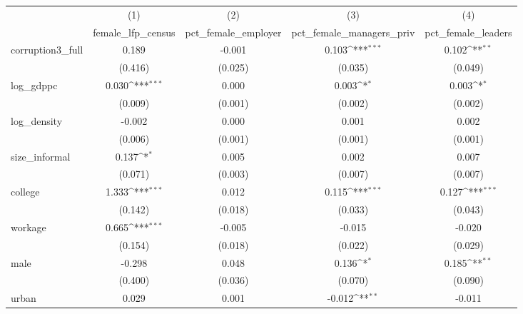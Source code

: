 {
\def\sym#1{\ifmmode^{#1}\else\(^{#1}\)\fi}
\begin{tabular}{l*{4}{c}}
\hline\hline
            &\multicolumn{1}{c}{(1)}&\multicolumn{1}{c}{(2)}&\multicolumn{1}{c}{(3)}&\multicolumn{1}{c}{(4)}\\
            &\multicolumn{1}{c}{female\_lfp\_census}&\multicolumn{1}{c}{pct\_female\_employer}&\multicolumn{1}{c}{pct\_female\_managers\_priv}&\multicolumn{1}{c}{pct\_female\_leaders}\\
\hline
corruption3\_full&       0.189         &      -0.001         &       0.103\sym{***}&       0.102\sym{**} \\
            &     (0.416)         &     (0.025)         &     (0.035)         &     (0.049)         \\
[1em]
log\_gdppc   &       0.030\sym{***}&       0.000         &       0.003\sym{*}  &       0.003\sym{*}  \\
            &     (0.009)         &     (0.001)         &     (0.002)         &     (0.002)         \\
[1em]
log\_density &      -0.002         &       0.000         &       0.001         &       0.002         \\
            &     (0.006)         &     (0.001)         &     (0.001)         &     (0.001)         \\
[1em]
size\_informal&       0.137\sym{*}  &       0.005         &       0.002         &       0.007         \\
            &     (0.071)         &     (0.003)         &     (0.007)         &     (0.007)         \\
[1em]
college     &       1.333\sym{***}&       0.012         &       0.115\sym{***}&       0.127\sym{***}\\
            &     (0.142)         &     (0.018)         &     (0.033)         &     (0.043)         \\
[1em]
workage     &       0.665\sym{***}&      -0.005         &      -0.015         &      -0.020         \\
            &     (0.154)         &     (0.018)         &     (0.022)         &     (0.029)         \\
[1em]
male        &      -0.298         &       0.048         &       0.136\sym{*}  &       0.185\sym{**} \\
            &     (0.400)         &     (0.036)         &     (0.070)         &     (0.090)         \\
[1em]
urban       &       0.029         &       0.001         &      -0.012\sym{**} &      -0.011         \\

\end{tabular}}
